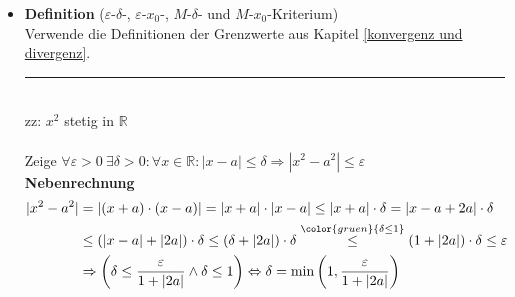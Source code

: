 \documentclass{article}
\newcommand{\lr}[1]{\left(#1\right)}
\newcommand{\commentmath}[1]{{\color{gruen}{#1}}}
\begin{document}
\begin{itemize}
\vspace{0.5cm}
		
\begin{minipage}{\textwidth}
{\color{blue}
\hrule
	\\
	ges: $\lim\limits_{x\rightarrow 0} \frac{\ln\lr{\frac{\sin x}{x}}}{x^2}$ mit Näherungen bis Grad 3 um $x=0$
		\begin{align*}
			\sin x &\approx x - \frac{x^3}{6} \qquad\Rightarrow \frac{\sin x }{x} \approx 1 - \frac{x^2}{6}\\
			\ln\lr{1 + x} &\approx x - \frac{x^2}{2} + \frac{x^3}{3} \qquad\Rightarrow \ln\lr{\frac{\sin x}{x}} \approx \ln\lr{1 + (-\frac{x^2}{6})} \approx -\frac{x^2}{6}\\
			\lim\limits_{x\rightarrow 0} \frac{\ln\lr{\frac{\sin x}{x}}}{x^2} &\approx \lim\limits_{x\rightarrow 0} \frac{-x^2/6}{x^2} = -\frac{1}{6}
		\end{align*}
\hrule
}
\end{minipage}


\newpage


	\item \textbf{Definition} ($\varepsilon$-$\delta$-, $\varepsilon$-$x_0$-, $M$-$\delta$- und $M$-$x_0$-Kriterium)\\
	Verwende die Definitionen der Grenzwerte aus Kapitel \ref{konvergenz und divergenz}.

\vspace{0.5cm}

\begin{minipage}{\textwidth}
{\color{blue}
\hrule
	\\
	zz: $x^2$ stetig in $\mathbb{R}$\\
	\\
	Zeige $\forall\varepsilon > 0\ \exists\delta > 0: \forall x\in\mathbb{R}: |x - a| \leq\delta \Rightarrow \left|x^2 - a^2\right| \leq \varepsilon$\\
	\textbf{Nebenrechnung}
		\begin{align*}
			|x^2 - a^2| &= |(x + a) \cdot (x - a)| = |x + a| \cdot |x - a| \leq |x + a| \cdot \delta = |x - a + 2a| \cdot \delta\\
			&\leq (|x - a| + |2a|) \cdot \delta \leq (\delta + |2a|) \cdot \delta \stackrel{\commentmath{\delta \leq 1}}{\leq} (1 + |2a|) \cdot \delta \leq \varepsilon\\
			&\Rightarrow \lr{\delta \leq \frac{\varepsilon}{1 + |2a|} \wedge \delta	\leq 1} \Leftrightarrow \delta = \min\lr{1, \frac{\varepsilon}{1 + |2a|}}
		\end{align*}

}
\end{minipage}
\end{itemize}
\end{document}
